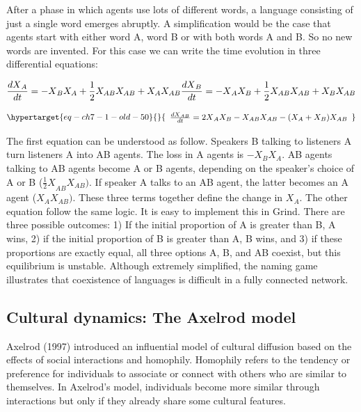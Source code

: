 \documentclass[
  a4paper,
  DIV=11,
  numbers=noendperiod,
  oneside]{scrreprt}
\begin{document}
After a phase in which agents use lots of different words, a language
consisting of just a single word emerges abruptly. A simplification
would be the case that agents start with either word A, word B or with
both words A and B. So no new words are invented. For this case we can
write the time evolution in three differential equations:

\[{\frac{{dX}_{A}}{dt} = {- X}_{B}X_{A} + {\frac{1}{2}}X_{AB}X_{AB} + X_{A}X_{AB}
}\\{\frac{{dX}_{B}}{dt} = {- X}_{A}X_{B} + {\frac{1}{2}}X_{AB}X_{AB} + X_{B}X_{AB}}\]

\begin{equation}\protect\hypertarget{eq-ch7-1-old-50}{}{\begin{array}{r}
\frac{{dX}_{AB}}{dt} = {2X}_{A}X_{B} - X_{AB}X_{AB} - (X_{A}+ X_{B})X_{AB}
\end{array}}\label{eq-ch7-1-old-50}\end{equation}

The first equation can be understood as follow. Speakers B talking to
listeners A turn listeners A into AB agents. The loss in A agents is
\({- X}_{B}X_{A}\). AB agents talking to AB agents become A or B agents,
depending on the speaker's choice of A or B
(\({\frac{1}{2}X}_{AB}X_{AB})\). If speaker A talks to an AB agent, the
latter becomes an A agent (\(X_{A}X_{AB})\). These three terms together
define the change in \(X_{A}.\) The other equation follow the same
logic. It is easy to implement this in Grind. There are three possible
outcomes: 1) If the initial proportion of A is greater than B, A wins,
2) if the initial proportion of B is greater than A, B wins, and 3) if
these proportions are exactly equal, all three options A, B, and AB
coexist, but this equilibrium is unstable. Although extremely
simplified, the naming game illustrates that coexistence of languages is
difficult in a fully connected network.

\hypertarget{sec-Cultural-dynamics-The-Axelrod-model}{%
\subsection{Cultural dynamics: The Axelrod
model}\label{sec-Cultural-dynamics-The-Axelrod-model}}

Axelrod (1997) introduced an influential model of cultural diffusion
based on the effects of social interactions and homophily. Homophily
refers to the tendency or preference for individuals to associate or
connect with others who are similar to themselves. In Axelrod's model,
individuals become more similar through interactions but only if they
already share some cultural features.
\end{document}
